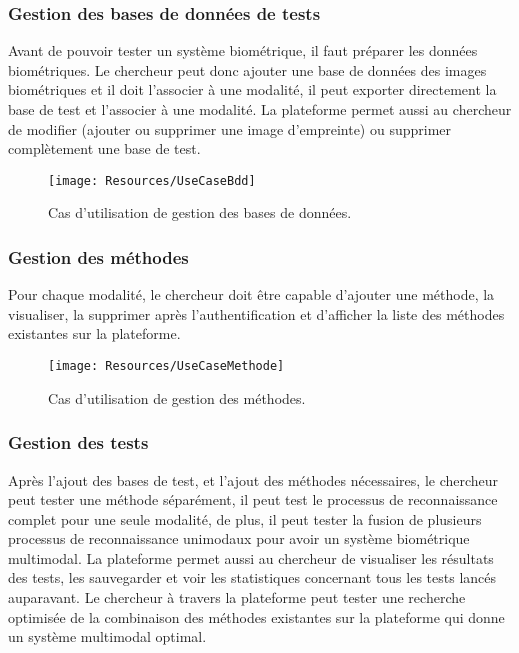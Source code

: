 \subsubsection{Gestion des bases de données de tests}
Avant de pouvoir tester un système biométrique, il faut préparer les données biométriques.
Le chercheur peut donc ajouter une base de données des images biométriques et il doit l’associer à une modalité, il peut exporter directement la base de test et l’associer à une modalité. La plateforme permet aussi au chercheur de modifier (ajouter ou supprimer une image d’empreinte) ou supprimer complètement une base de test.

\begin{figure}[H]
	\centering
	\texttt{[image: Resources/UseCaseBdd]}
	
	\caption{Cas d'utilisation de gestion des bases de données.}
	\label{usecasebdd}
\end{figure}

\subsubsection{Gestion des méthodes}
Pour chaque modalité, le chercheur doit être capable d’ajouter une méthode, la visualiser, la supprimer après l’authentification et d’afficher la liste des méthodes existantes sur la plateforme.
\begin{figure}[H]
	\centering
	\texttt{[image: Resources/UseCaseMethode]}
	
	\caption{Cas d'utilisation de gestion des méthodes.}
	\label{usecasemethod}
\end{figure}
\subsubsection{Gestion des tests}
Après l’ajout des bases de test, et l’ajout des méthodes nécessaires, le chercheur peut tester une méthode séparément, il peut test le processus de reconnaissance complet pour une seule modalité, de plus, il peut tester la fusion de plusieurs processus de reconnaissance unimodaux pour avoir un système biométrique multimodal.
La plateforme permet aussi au chercheur de visualiser les résultats des tests, les sauvegarder et voir les statistiques concernant tous les tests lancés auparavant. Le chercheur à travers la plateforme peut tester une recherche optimisée de la combinaison des méthodes existantes sur la plateforme qui donne un système multimodal optimal.


